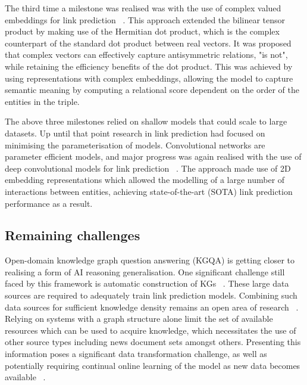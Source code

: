 \noindent The third time a milestone was realised was with the use of complex valued embeddings for link prediction \unskip~\citep{trouillon2016complex}. This approach extended the bilinear tensor product by making use of the Hermitian dot product, which is the complex counterpart of the standard dot product between real vectors. It was proposed that complex vectors can effectively capture antisymmetric relations, "is not", while retaining the efficiency benefits of the dot product. This was achieved by using representations with complex embeddings, allowing the model to capture semantic meaning by computing a relational score dependent on the order of the entities in the triple. \par
 
\noindent The above three milestones relied on shallow models that could scale to large datasets. Up until that point research in link prediction had focused on minimising the parameterisation of models. Convolutional networks are parameter efficient models, and major progress was again realised with the use of deep convolutional models for link prediction \unskip~\citep{dettmers2018convolutional}. The approach made use of 2D embedding representations which allowed the modelling of a large number of interactions between entities, achieving state-of-the-art (SOTA) link prediction performance as a result. \par

\subsection{Remaining challenges}

\noindent Open-domain knowledge graph question answering (KGQA) is getting closer to realising a form of AI reasoning generalisation. One significant challenge still faced by this framework is automatic construction of KGs \unskip~\citep{dong2014knowledge}. These large data sources are required to adequately train link prediction models. Combining such data sources for sufficient knowledge density remains an open area of research \unskip~\citep{diefenbach2018wdaqua}. Relying on systems with a graph structure alone limit the set of available resources which can be used to acquire knowledge, which necessitates the use of other source types including news document sets amongst others. Presenting this information poses a significant data transformation challenge, as well as potentially requiring continual online learning of the model as new data becomes available \unskip~\citep{abujabal2018never}. \par

